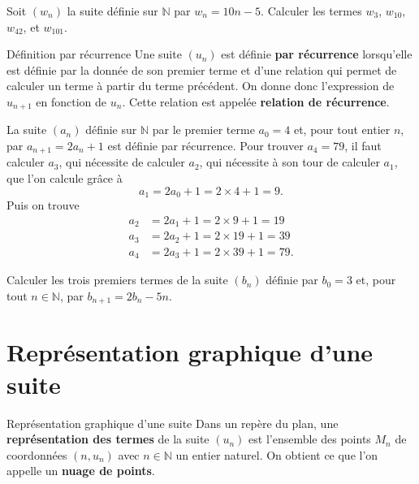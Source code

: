 \documentclass[11pt]{article}
\begin{document}
\begin{app}
  Soit $(w_n)$ la suite définie sur $\mathbb{N}$ par $w_n=10n-5$. Calculer les
  termes $w_3$, $w_{10}$, $w_{42}$, et $w_{101}$.
\end{app}

\begin{defi}{Définition par récurrence}
  Une suite $(u_n)$ est définie \textbf{par récurrence} lorsqu'elle est définie par la
  donnée de son premier terme et d'une relation qui permet de calculer un terme
  à partir du terme précédent. On donne donc l'expression de $u_{n+1}$ en
  fonction de $u_n$. Cette relation est appelée \textbf{relation de récurrence}.
\end{defi}

\begin{exemple}
  La suite $(a_n)$ définie sur $\mathbb{N}$ par le premier terme $a_0=4$ et,
  pour tout entier $n$, par $a_{n+1}=2a_n+1$ est définie par récurrence. Pour
  trouver $a_4=79$, il faut calculer $a_3$, qui nécessite de calculer $a_2$, qui
  nécessite à son tour de calculer $a_1$, que l'on calcule gr\^ace à
  \[
    a_1 = 2a_0+1 = 2\times 4+1=9.
  \]
  Puis on trouve
  \begin{align*}
    a_2 &= 2a_1+1 = 2\times9+1=19 \\
    a_3 &= 2a_2+1 = 2\times19+1=39 \\
    a_4 &= 2a_3+1 = 2\times39+1=79.
  \end{align*}
\end{exemple}

\begin{app}
  Calculer les trois premiers termes de la suite $(b_n)$ définie par $b_0=3$ et,
  pour tout $n\in\mathbb{N}$, par $b_{n+1}=2b_n-5n$.
\end{app}

\section{Représentation graphique d'une suite}

\begin{defi}{Représentation graphique d'une suite}
  Dans un repère du plan, une \textbf{représentation des termes} de la suite
  $(u_n)$ est l'ensemble des points $M_n$ de coordonnées $(n, u_n)$ avec
  $n\in\mathbb{N}$ un entier naturel. On obtient ce que l'on appelle un
  \textbf{nuage de points}. 
\end{defi}
\end{document}
